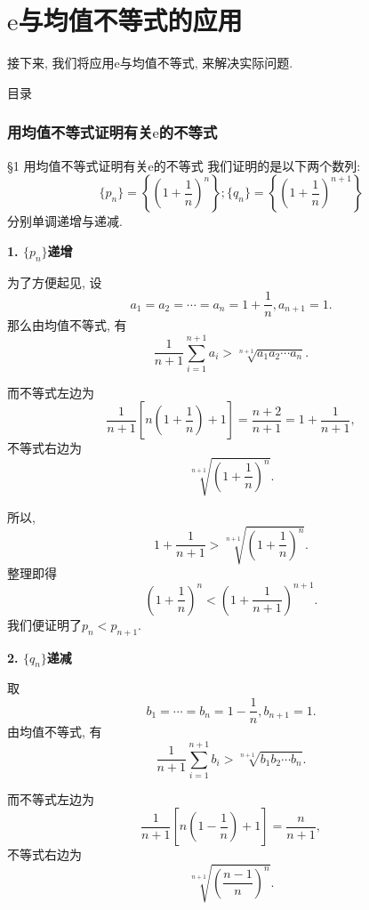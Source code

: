 \documentclass[serif]{beamer}
\begin{document}
\part{$\mathrm{e}$与均值不等式的应用}

\begin{frame}
	\partpage
	\noindent\begin{center}
		\kaishu 接下来, 我们将应用$\mathrm{e}$与均值不等式, 来解决实际问题.
	\end{center}
\end{frame}

\begin{frame}{目录}
	\tableofcontents
\end{frame}

\section{\heiti 用均值不等式证明有关$\mathrm{e}$的不等式}

\begin{frame}{\S1 用均值不等式证明有关$\mathrm{e}$的不等式}
	我们证明的是以下两个数列:
	\[\{p_n\}=\left\{\left(1+\frac{1}{n}\right)^n\right\}; \{q_n\}=\left\{\left(1+\frac{1}{n}\right)^{n+1}\right\}\]
	分别单调递增与递减.
\end{frame}

\begin{frame}
	\textbf{1. $\{p_n\}$递增}\par
	为了方便起见, 设
	\[a_1=a_2=\cdots=a_n=1+\frac{1}{n}, a_{n+1}=1.\]
	那么由均值不等式, 有
	\[\frac{1}{n+1}\sum\limits_{i=1}^{n+1}a_i>\sqrt[n+1]{a_1a_2\cdots a_n}.\]\par
	而不等式左边为
	\[\frac{1}{n+1}\left[n\left(1+\frac{1}{n}\right)+1\right]=\frac{n+2}{n+1}=1+\frac{1}{n+1},\]
	不等式右边为
	\[\sqrt[n+1]{\left(1+\frac{1}{n}\right)^n}.\]
\end{frame}

\begin{frame}
	所以, 
	\[1+\frac{1}{n+1}>\sqrt[n+1]{\left(1+\frac{1}{n}\right)^n}.\]
	整理即得
	\[\left(1+\frac{1}{n}\right)^n<\left(1+\frac{1}{n+1}\right)^{n+1}.\]
	我们便证明了$p_n<p_{n+1}.$
\end{frame}

\begin{frame}
	\textbf{2. $\{q_n\}$递减}\par
	取
	\[b_1=\cdots=b_n=1-\frac{1}{n},b_{n+1}=1.\]
	由均值不等式, 有
	\[\frac{1}{n+1}\sum\limits_{i=1}^{n+1}b_i>\sqrt[n+1]{b_1b_2\cdots b_n}.\]\par
	而不等式左边为
	\[\frac{1}{n+1}\left[n\left(1-\frac{1}{n}\right)+1\right]=\frac{n}{n+1},\]
	不等式右边为
	\[\sqrt[n+1]{\left(\frac{n-1}{n}\right)^n}.\]
\end{frame}
\end{document}
